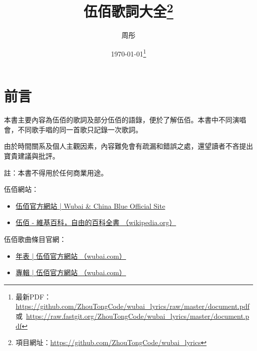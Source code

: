 \documentclass[UTF8,a4paper,oneside,twocolumn,12pt]{ctexbook}
\title{伍佰歌詞大全\thanks{項目網址：\url{https://github.com/ZhouTongCode/wubai_lyrics}}}
\author{周彤}
\date{\today\thanks{最新PDF：\url{https://github.com/ZhouTongCode/wubai_lyrics/raw/master/document.pdf}~或~\url{https://raw.fastgit.org/ZhouTongCode/wubai_lyrics/master/document.pdf}}}
\begin{document}
\frontmatter
\maketitle

\onecolumn

\chapter*{前言}
本書主要內容為伍佰的歌詞及部分伍佰的語錄，便於了解伍佰。本書中不同演唱會，不同歌手唱的同一首歌只記錄一次歌詞。

由於時間關系及個人主觀因素，內容難免會有疏漏和錯誤之處，還望讀者不吝提出寶貴建議與批評。

註：本書不得用於任何商業用途。

伍佰網站：
\begin{itemize}
	\item \href{http://wubai.com/}{伍佰官方網站 | Wubai \& China Blue Official Site}
	\item \href{https://zh.wikipedia.org/zh-tw/%E4%BC%8D%E4%BD%B0}{伍佰 - 維基百科，自由的百科全書 （wikipedia.org）}
\end{itemize}

伍佰歌曲條目官網：
\begin{itemize}
	\item \href{http://wubai.com/biography/%e5%b9%b4%e8%a1%a8/}{年表 | 伍佰官方網站 （wubai.com）}
	\item \href{http://wubai.com/discography/%E5%B0%88%E8%BC%AF/}{專輯 | 伍佰官方網站 （wubai.com）}
\end{itemize}
\end{document}
